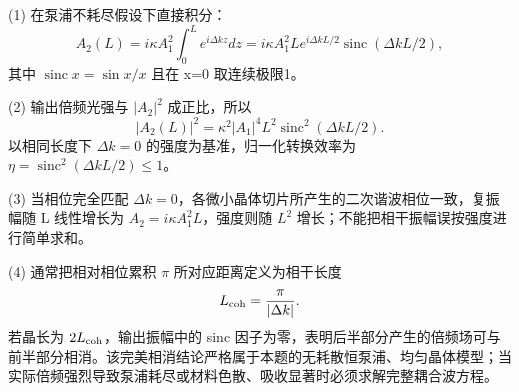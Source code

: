 (1) 在泵浦不耗尽假设下直接积分：
\[
A_2(L)=i\kappa A_1^2\int_0^Le^{i\Delta kz}dz
=i\kappa A_1^2Le^{i\Delta kL/2}
\operatorname{sinc}(\Delta kL/2),
\]
其中 \(\operatorname{sinc}x=\sin x/x\) 且在 x=0 取连续极限1。

(2) 输出倍频光强与 \(|A_2|^2\) 成正比，所以
\[
|A_2(L)|^2=\kappa^2|A_1|^4L^2
\operatorname{sinc}^2(\Delta kL/2).
\]
以相同长度下 \(\Delta k=0\) 的强度为基准，归一化转换效率为 \(\eta=\operatorname{sinc}^2(\Delta kL/2)\le1\)。

(3) 当相位完全匹配 \(\Delta k=0\)，各微小晶体切片所产生的二次谐波相位一致，复振幅随 L 线性增长为 \(A_2=i\kappa A_1^2L\)，强度则随 \(L^2\) 增长；不能把相干振幅误按强度进行简单求和。

(4) 通常把相对相位累积 \(\pi \) 所对应距离定义为相干长度
\[
L_{\rm coh}=\frac{\pi}{|\Delta k|}.
\]
若晶长为 \(2L_{\rm coh}\)，输出振幅中的 sinc 因子为零，表明后半部分产生的倍频场可与前半部分相消。该完美相消结论严格属于本题的无耗散恒泵浦、均匀晶体模型；当实际倍频强烈导致泵浦耗尽或材料色散、吸收显著时必须求解完整耦合波方程。
